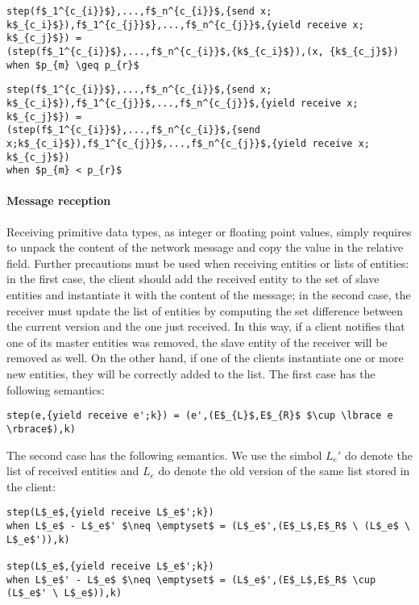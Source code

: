 \begin{lstlisting}[mathescape = true]
step(f$_1^{c_{i}}$},...,f$_n^{c_{i}}$,{send x; k$_{c_i}$}),f$_1^{c_{j}}$},...,f$_n^{c_{j}}$,{yield receive x; k$_{c_j}$}) =
(step(f$_1^{c_{i}}$},...,f$_n^{c_{i}}$,{k$_{c_i}$}),(x, {k$_{c_j}$})
when $p_{m} \geq p_{r}$
\end{lstlisting}

\begin{lstlisting}[mathescape = true]
step(f$_1^{c_{i}}$},...,f$_n^{c_{i}}$,{send x; k$_{c_i}$}),f$_1^{c_{j}}$,...,f$_n^{c_{j}}$,{yield receive x; k$_{c_j}$}) =
(step(f$_1^{c_{i}}$},...,f$_n^{c_{i}}$,{send x;k$_{c_i}$}),f$_1^{c_{j}}$,...,f$_n^{c_{j}}$,{yield receive x; k$_{c_j}$})
when $p_{m} < p_{r}$
\end{lstlisting}

\paragraph{Message reception}
Receiving primitive data types, as integer or floating point values, simply requires to unpack the content of the network message and copy the value in the relative field. Further precautions must be used when receiving entities or lists of entities: in the first case, the client should add the received entity to the set of slave entities and instantiate it with the content of the message; in the second case, the receiver must update the list of entities by computing the set difference between the current version and the one just received. In this way, if a client notifies that one of its master entities was removed, the slave entity of the receiver will be removed as well. On the other hand, if one of the clients instantiate one or more new entities, they will be correctly added to the list. The first case has the following semantics:

\begin{lstlisting}[mathescape = true]
step(e,{yield receive e';k}) = (e',(E$_{L}$,E$_{R}$ $\cup \lbrace e \rbrace$),k)
\end{lstlisting}

\noindent
The second case has the following semantics. We use the simbol $L_{e}'$ do denote the list of received entities and $L_{e}$ do denote the old version of the same list stored in the client:
\begin{lstlisting}[mathescape = true]
step(L$_e$,{yield receive L$_e$';k})
when L$_e$ - L$_e$' $\neq \emptyset$ = (L$_e$',(E$_L$,E$_R$ \ (L$_e$ \ L$_e$')),k)

step(L$_e$,{yield receive L$_e$';k})
when L$_e$' - L$_e$ $\neq \emptyset$ = (L$_e$',(E$_L$,E$_R$ \cup (L$_e$' \ L$_e$)),k)
\end{lstlisting}

